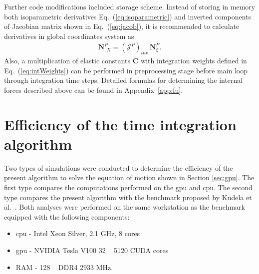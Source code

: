\documentclass[11pt,a4paper,final]{report}
\theoremstyle{plain}
\begin{document}
Further code modifications included storage scheme.
Instead of storing in memory both isoparametric derivatives Eq.~(\ref{eq:isoparametric}) and inverted components of Jacobian matrix shown in Eq.~(\ref{eq:jacob}), it is recommended to calculate derivatives in global coordinates system as
\begin{eqnarray}
	\textbf{N}^P_{,X} = \left(\mathcal{J}^P\right)_{inv}\,\textbf{N}^P_{\xi}.
\end{eqnarray}
Also, a multiplication of elastic constants \(\textbf{C}\) with integration weights defined in Eq.~(\ref{eq:intWeights}) can be performed in preprocessing stage before main loop through integration time steps.
Detailed formulas for determining the internal forces described above can be found in Appendix~\ref{app:fu}.

 \section{Efficiency of the time integration algorithm}

Two types of simulations were conducted to determine the efficiency of the present algorithm to solve the equation of motion shown in Section \ref{sec:gpu}.
The first type compares the computations performed on the \ac{gpu} and \ac{cpu}.
The second type compares the present algorithm with the benchmark proposed by Kudela et al.~\cite{kudela2020parallel}.
Both analyses were performed on the same workstation as the benchmark equipped with the following components:
\begin{itemize}
	\item \ac{cpu} - Intel Xeon Silver, 2.1 \unit{\giga\Hz}, 8 cores
	\item \ac{gpu} - NVIDIA Tesla V100 32 \unit{\giga\byte} 5120 CUDA cores
	\item RAM - 128 \unit{\giga\byte} DDR4 2933 \unit{\mega\Hz}.
\end{itemize}
\end{document}
